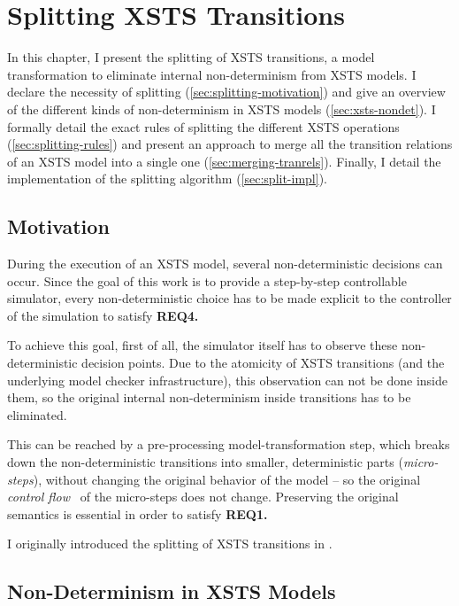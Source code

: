 \chapter{Splitting XSTS Transitions}\label{ch:splitting}

In this chapter, I present the splitting of XSTS transitions, a model transformation to eliminate internal non-determinism from XSTS models. I declare the necessity of splitting (\autoref{sec:splitting-motivation}) and give an overview of the different kinds of non-determinism in XSTS models (\autoref{sec:xsts-nondet}). I formally detail the exact rules of splitting the different XSTS operations (\autoref{sec:splitting-rules}) and present an approach to merge all the transition relations of an XSTS model into a single one (\autoref{sec:merging-tranrels}). Finally, I detail the implementation of the splitting algorithm (\autoref{sec:split-impl}).

\section{Motivation}\label{sec:splitting-motivation}

During the execution of an XSTS model, several non-deterministic decisions can occur. Since the goal of this work is to provide a step-by-step controllable simulator, every non-deterministic choice has to be made explicit to the controller of the simulation to satisfy \textbf{REQ4.}

To achieve this goal, first of all, the simulator itself has to observe these non-deterministic decision points. Due to the atomicity of XSTS transitions (and the underlying model checker infrastructure), this observation can not be done inside them, so the original internal non-determinism inside transitions has to be eliminated.

This can be reached by a pre-processing model-transformation step, which breaks down the non-deterministic transitions into smaller, deterministic parts (\textit{micro-steps}), without changing the original behavior of the model -- so the original \textit{control flow}~\cite{cfa} of the micro-steps does not change. Preserving the original semantics is essential in order to satisfy \textbf{REQ1.}

I originally introduced the splitting of XSTS transitions in \cite{xsts-split}.

\section{Non-Determinism in XSTS Models}\label{sec:xsts-nondet}

